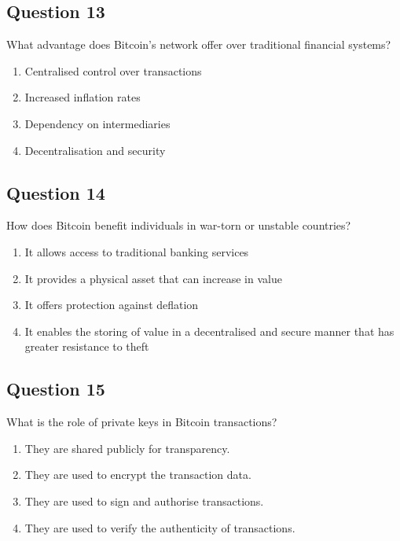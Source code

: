 \documentclass[12pt,a4paper]{article}
\begin{document}
\bigskip


\subsection*{Question 13}
What advantage does Bitcoin's network offer over traditional financial systems?

\begin{enumerate}[label=\Alph*., leftmargin=*]
\item Centralised control over transactions
\item Increased inflation rates
\item Dependency on intermediaries
\item Decentralisation and security
\end{enumerate}

\bigskip


\subsection*{Question 14}
How does Bitcoin benefit individuals in war-torn or unstable countries?

\begin{enumerate}[label=\Alph*., leftmargin=*]
\item It allows access to traditional banking services
\item It provides a physical asset that can increase in value
\item It offers protection against deflation
\item It enables the storing of value in a decentralised and secure manner that has greater resistance to theft
\end{enumerate}

\bigskip


\subsection*{Question 15}
What is the role of private keys in Bitcoin transactions?

\begin{enumerate}[label=\Alph*., leftmargin=*]
\item They are shared publicly for transparency.
\item They are used to encrypt the transaction data.
\item They are used to sign and authorise transactions.
\item They are used to verify the authenticity of transactions.
\end{enumerate}
\end{document}
